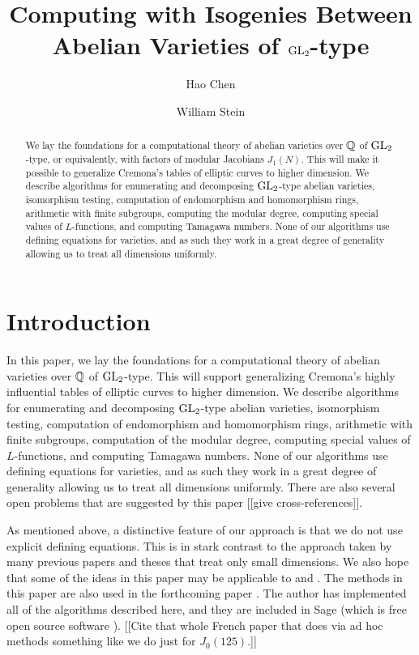 \documentclass{article}
\title{Computing with Isogenies Between Abelian Varieties of $\operatorname{GL}_2$-type}
\author{Hao Chen \and William Stein}
\begin{document}
\maketitle
\tableofcontents
\begin{abstract}
  We lay the foundations for a computational theory of abelian
  varieties over $\mathbb{Q}$ of $\operatorname{GL}_2$-type, or equivalently, with factors
  of modular Jacobians $J_1(N)$.  This will make it possible to
  generalize Cremona's tables of elliptic curves to higher dimension.
  We describe algorithms for enumerating and decomposing $\operatorname{GL}_2$-type
  abelian varieties, isomorphism testing, computation of endomorphism
  and homomorphism rings, arithmetic with finite subgroups, computing
  the modular degree, computing special values of $L$-functions, and
  computing Tamagawa numbers.  None of our algorithms use defining
  equations for varieties, and as such they work in a great degree of
  generality allowing us to treat all dimensions uniformly.
\end{abstract}


\section{Introduction}
In this paper, we lay the foundations for a computational theory of
abelian varieties over $\mathbb{Q}$ of $\operatorname{GL}_2$-type.  This will support
generalizing Cremona's highly influential tables \cite{cremona:algs}
of elliptic curves to higher dimension.  We describe algorithms for
enumerating and decomposing $\operatorname{GL}_2$-type abelian varieties,
isomorphism testing, computation of endomorphism and homomorphism
rings, arithmetic with finite subgroups, computation of the modular
degree, computing special values of $L$-functions, and computing
Tamagawa numbers.  None of our algorithms use defining equations for
varieties, and as such they work in a great degree of generality
allowing us to treat all dimensions uniformly.  There are also several
open problems that are suggested by this paper [[give
cross-references]].

As mentioned above, a distinctive feature of our approach is that we
do not use explicit defining equations. This is in stark contrast to the
approach taken by many previous papers and theses \cite{empirical}
that treat only small dimensions.  We also hope that some of the ideas
in this paper may be applicable to \cite{MR2282913} and
\cite{jordiquer}.  The methods in this paper are also used in the
forthcoming paper \cite{calegari-stein:eisenstein}.  The author has
implemented all of the algorithms described here, and they are
included in Sage (which is free open source software \cite{sage}).
[[Cite that whole French paper that does via ad hoc methods something
like we do just for $J_0(125)$.]]
\end{document}
